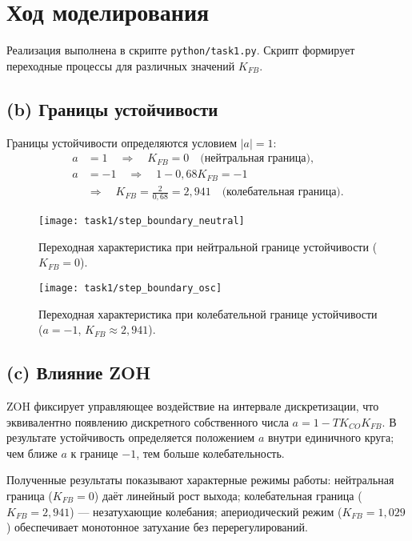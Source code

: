 \section{Ход моделирования}
Реализация выполнена в скрипте \texttt{python/task1.py}. Скрипт формирует переходные процессы для различных значений \(K_{FB}\).

\subsection*{(b) Границы устойчивости}
Границы устойчивости определяются условием \(|a| = 1\):
\begin{align}
  a &= 1 \quad \Rightarrow \quad K_{FB} = 0 \quad \text{(нейтральная граница)}, \\
  a &= -1 \quad \Rightarrow \quad 1 - 0{,}68 K_{FB} = -1 \\
  &\Rightarrow \quad K_{FB} = \frac{2}{0{,}68} = 2{,}941 \quad \text{(колебательная граница)}.
\end{align}
\begin{figure}[H]
  \centering
  \texttt{[image: task1/step\_boundary\_neutral]}
  \caption{Переходная характеристика при нейтральной границе устойчивости (\(K_{FB}=0\)).}
  \label{fig:task1_neutral}
\end{figure}
\begin{figure}[H]
  \centering
  \texttt{[image: task1/step\_boundary\_osc]}
  \caption{Переходная характеристика при колебательной границе устойчивости (\(a=-1\), \(K_{FB}\approx2{,}941\)).}
  \label{fig:task1_osc}
\end{figure}

\subsection*{(c) Влияние ZOH}
ZOH фиксирует управляющее воздействие на интервале дискретизации, что эквивалентно появлению дискретного собственного числа \(a=1-TK_{CO}K_{FB}\). В результате устойчивость определяется положением \(a\) внутри единичного круга; чем ближе \(a\) к границе \(-1\), тем больше колебательность.

Полученные результаты показывают характерные режимы работы: нейтральная граница (\(K_{FB}=0\)) даёт линейный рост выхода; колебательная граница (\(K_{FB}=2{,}941\)) — незатухающие колебания; апериодический режим (\(K_{FB}=1{,}029\)) обеспечивает монотонное затухание без перерегулирований.

